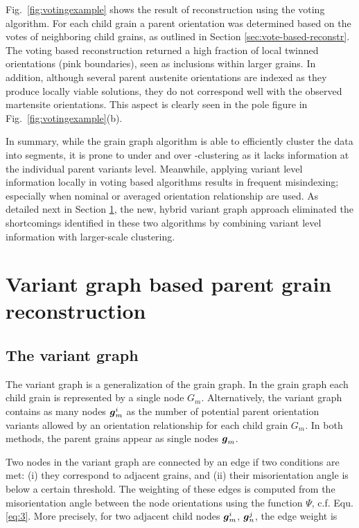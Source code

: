 \documentclass{elsarticle}
\renewcommand{\vec}[1]{\ensuremath \mathbf{\boldsymbol{#1}}}
\numberwithin{equation}{section}
\begin{document}
Fig.~\ref{fig:votingexample} shows the result of reconstruction using the voting algorithm. For each child grain a parent orientation was determined based on the votes of neighboring child grains, as outlined in Section \ref{sec:vote-based-reconstr}. The voting based reconstruction returned a high fraction of local twinned orientations (pink boundaries), seen as inclusions within larger grains. In addition, although several parent austenite orientations are indexed as they produce locally viable solutions, they do not correspond well with the observed martensite orientations. This aspect is clearly seen in the pole figure in Fig.~\ref{fig:votingexample}(b). 

In summary, while the grain graph algorithm is able to efficiently cluster the data into segments, it is prone to under and over -clustering as it lacks information at the individual parent variants level. Meanwhile, applying variant level information locally in voting based algorithms results in frequent misindexing; especially when nominal or averaged orientation relationship are used. As detailed next in Section \ref{sec:variant-graph-based-reconstr}, the new, hybrid variant graph approach eliminated the shortcomings identified in these two algorithms by combining variant level information with larger-scale clustering. 


\section{Variant graph based parent grain reconstruction}
\label{sec:variant-graph-based-reconstr}


\subsection{The variant graph}
The variant graph is a generalization of the grain graph. In the grain graph each child grain is represented by a single node $G_m$. Alternatively, the variant graph contains as many nodes $\vec g_m^i$ as the number of potential parent orientation variants allowed by an orientation relationship for each child grain $G_m$. In both methods, the parent grains appear as single nodes $\vec g_m$. 

Two nodes in the variant graph are connected by an edge if two conditions are met: (i) they correspond to adjacent grains, and (ii) their misorientation angle is below a certain threshold. The weighting of these edges is computed from the misorientation angle between the node orientations using the function $\Psi$, c.f. Equ. \eqref{eq:3}. More precisely, for two adjacent child nodes $\vec g_m^i$, $\vec g_n^j$, the edge weight is 
\end{document}
